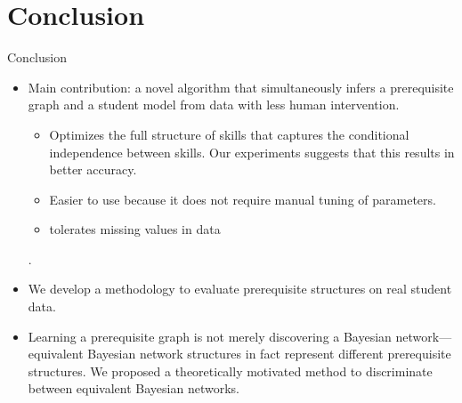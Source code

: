 \documentclass[hyperref={pdfpagelabels=false}]{beamer}
\begin{document}
\section{Conclusion}
\begin{frame}{Conclusion}
\begin{itemize}
	\item Main contribution: a novel algorithm that simultaneously infers \alert{a prerequisite graph} and \alert{a student model} from data with less human intervention.
	\begin{itemize}
		\item Optimizes the full structure of skills that captures the \alert{conditional independence} between skills. Our experiments suggests that this results in better accuracy.
		\item Easier to use because it does not require  manual tuning of  parameters.
		\item tolerates missing values in data
	\end{itemize}.
	\item We develop a methodology to evaluate  prerequisite structures on real student data.
	\item Learning a prerequisite graph is not merely discovering a Bayesian network--- 
	\alert{equivalent Bayesian network structures} in fact represent different prerequisite structures.
	We proposed a theoretically motivated method to discriminate between equivalent Bayesian networks.
\end{itemize}
\end{frame}


\end{document}
